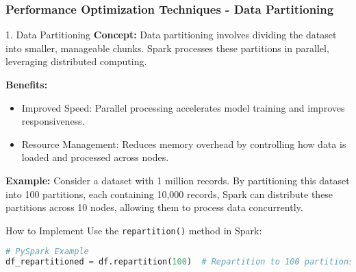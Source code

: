 \documentclass[aspectratio=169]{beamer}
\begin{document}
\begin{frame}[fragile]
    \frametitle{Performance Optimization Techniques - Data Partitioning}
    \begin{block}{1. Data Partitioning}
        \textbf{Concept:} Data partitioning involves dividing the dataset into smaller, manageable chunks. Spark processes these partitions in parallel, leveraging distributed computing.
        
        \textbf{Benefits:}
        \begin{itemize}
            \item Improved Speed: Parallel processing accelerates model training and improves responsiveness.
            \item Resource Management: Reduces memory overhead by controlling how data is loaded and processed across nodes.
        \end{itemize}
        
        \textbf{Example:} 
        Consider a dataset with 1 million records. By partitioning this dataset into 100 partitions, each containing 10,000 records, Spark can distribute these partitions across 10 nodes, allowing them to process data concurrently.
    \end{block}
    
    \begin{block}{How to Implement}
        Use the \texttt{repartition()} method in Spark:
        \begin{lstlisting}[language=Python]
# PySpark Example
df_repartitioned = df.repartition(100)  # Repartition to 100 partitions
        \end{lstlisting}
    \end{block}
\end{frame}
\end{document}
